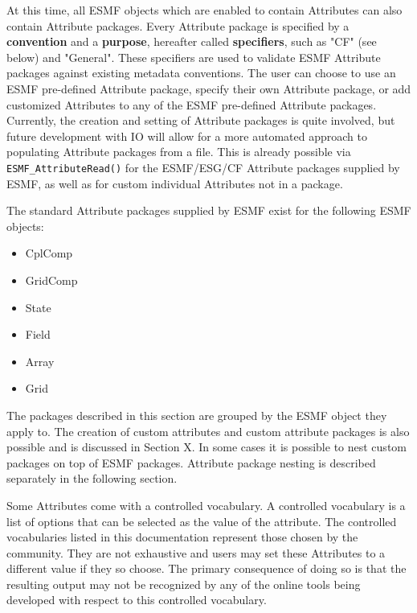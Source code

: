 %


\label{sec:AttPacks}

At this time, all ESMF objects which are enabled to contain Attributes can also contain Attribute packages.  Every Attribute package is specified by a {\bf convention} and a {\bf purpose}, hereafter called {\bf specifiers}, such as "CF" (see below) and "General".  These specifiers are used to validate ESMF Attribute packages against existing metadata conventions.  The user can choose to use an ESMF pre-defined Attribute package, specify their own Attribute package, or add customized Attributes to any of the ESMF pre-defined Attribute packages. Currently, the creation and setting of Attribute packages is quite involved, but future development with IO will allow for a more automated approach to populating Attribute packages from a file.  This is already possible via {\tt ESMF\_AttributeRead()} for the ESMF/ESG/CF Attribute packages supplied by ESMF, as well as for custom individual Attributes not in a package.

The standard Attribute packages supplied by ESMF exist for the following ESMF objects:

\begin{itemize}
    \item CplComp
    \item GridComp
    \item State
    \item Field
    \item Array
    \item Grid
\end{itemize}

The packages described in this section are grouped by the ESMF object they apply to. The creation of custom attributes and custom attribute packages is also possible and is discussed in Section X. In some cases it is possible to nest custom packages on top of ESMF packages. Attribute package nesting is described separately in the following section.  

Some Attributes come with a controlled vocabulary. A controlled vocabulary is a list of options that can be selected as the value of the attribute. The controlled vocabularies listed in this documentation represent those chosen by the community. They are not exhaustive and users may set these Attributes to a different value if they so choose. The primary consequence of doing so is that the resulting output may not be recognized by any of the online tools being developed with respect to this controlled vocabulary.  

